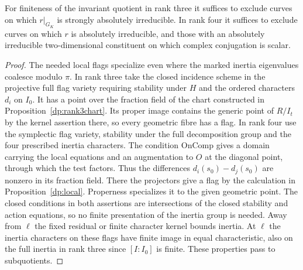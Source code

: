 \begin{proposition}\label{dp:curvebranches}
For finiteness of the invariant quotient in rank three it suffices
to exclude curves on which \(r|_{G_K}\) is strongly absolutely
irreducible. In rank four it suffices to exclude curves on which
\(r\) is absolutely irreducible, and those with an absolutely
irreducible two-dimensional constituent on which complex conjugation
is scalar.
\end{proposition}
\begin{proof}
The needed local flags specialize even where the marked inertia
eigenvalues coalesce modulo \(\pi\). In rank three take the closed
incidence scheme in the projective full flag variety requiring
stability under \(H\) and the ordered characters \(d_i\) on \(I_0\).
It has a point over the fraction field of the chart constructed
in Proposition~\ref{dp:rank3chart}. Its proper image contains the
generic point of \(R/I_t\) by the kernel assertion there, so every
geometric fibre has a flag. In rank four use the symplectic flag
variety, stability under the full decomposition group and the four
prescribed inertia characters. The condition \(\mathrm{OnComp}\)
gives a domain carrying the local equations and an augmentation to
\(O\) at the diagonal point, through which the test factors. Thus
the differences \(d_i(s_0)-d_j(s_0)\) are nonzero in its fraction
field. There the projectors give a flag by the calculation in
Proposition~\ref{dp:local}. Properness specializes it to the given
geometric point. The closed
conditions in both assertions are intersections of the closed
stability and action equations, so no finite presentation of the
inertia group is needed. Away from \(\ell\) the fixed residual
or finite character kernel bounds inertia. At \(\ell\) the
inertia characters on these flags have finite image in equal
characteristic, also on the full inertia in rank three since
\([I:I_0]\) is finite. These properties pass to subquotients.


\end{proof}
